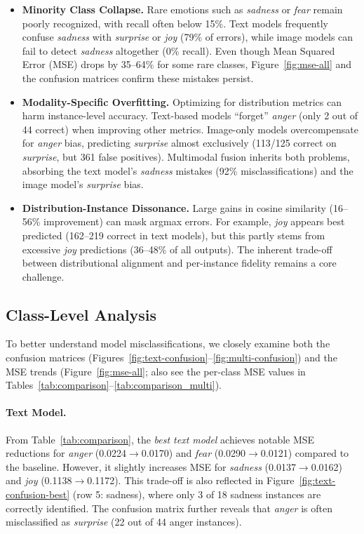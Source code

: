 \begin{itemize}
    \item \textbf{Minority Class Collapse.} Rare emotions such as \emph{sadness} or \emph{fear} remain poorly recognized, with recall often below 15\%. Text models frequently confuse \emph{sadness} with \emph{surprise} or \emph{joy} (79\% of errors), while image models can fail to detect \emph{sadness} altogether (0\% recall). Even though Mean Squared Error (MSE) drops by 35--64\% for some rare classes, Figure~\ref{fig:mse-all} and the confusion matrices confirm these mistakes persist.

    \item \textbf{Modality-Specific Overfitting.} Optimizing for distribution metrics can harm instance-level accuracy. Text-based models “forget” \emph{anger} (only 2 out of 44 correct) when improving other metrics. Image-only models overcompensate for \emph{anger} bias, predicting \emph{surprise} almost exclusively (113/125 correct on \emph{surprise}, but 361 false positives). Multimodal fusion inherits both problems, absorbing the text model's \emph{sadness} mistakes (92\% misclassifications) and the image model's \emph{surprise} bias.

    \item \textbf{Distribution-Instance Dissonance.} Large gains in cosine similarity (16--56\% improvement) can mask argmax errors. For example, \emph{joy} appears best predicted (162--219 correct in text models), but this partly stems from excessive \emph{joy} predictions (36--48\% of all outputs). The inherent trade-off between distributional alignment and per-instance fidelity remains a core challenge.
\end{itemize}


\subsection{Class-Level Analysis}
\label{subsec:class-level}

To better understand model misclassifications, we closely examine both the confusion matrices (Figures~\ref{fig:text-confusion}--\ref{fig:multi-confusion}) and the MSE trends (Figure~\ref{fig:mse-all}; also see the per-class MSE values in Tables~\ref{tab:comparison}--\ref{tab:comparison_multi}).

\paragraph{Text Model.} 
From Table~\ref{tab:comparison}, the \emph{best text model} achieves notable MSE reductions for \emph{anger} (0.0224$\rightarrow$0.0170) and \emph{fear} (0.0290$\rightarrow$0.0121) compared to the baseline. However, it slightly increases MSE for \emph{sadness} (0.0137$\rightarrow$0.0162) and \emph{joy} (0.1138$\rightarrow$0.1172). This trade-off is also reflected in Figure~\ref{fig:text-confusion-best} (row 5: sadness), where only 3 of 18 sadness instances are correctly identified. The confusion matrix further reveals that \emph{anger} is often misclassified as \emph{surprise} (22 out of 44 anger instances).

